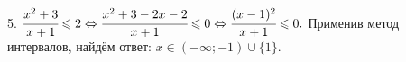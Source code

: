 5. $\cfrac{x^2+3}{x+1}\leqslant2 \Leftrightarrow \cfrac{x^2+3-2x-2}{x+1} \leqslant0\Leftrightarrow \cfrac{(x-1)^2}{x+1} \leqslant0.$ Применив метод интервалов, найдём ответ: $x\in(-\infty;-1)\cup\{1\}.$\\
